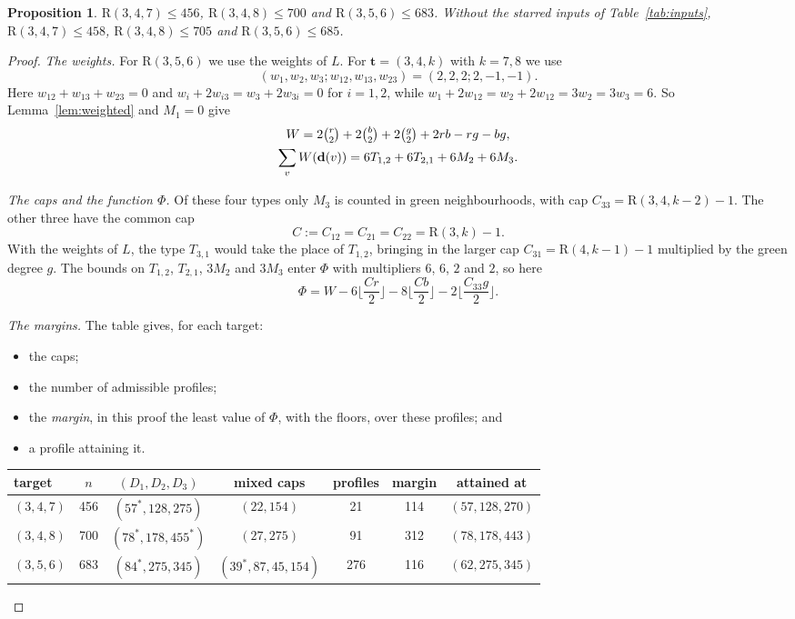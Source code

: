 \documentclass[11pt]{article}
\theoremstyle{spacedplain}
\newtheorem{proposition}[theorem]{Proposition}
\theoremstyle{spaceddef}
\theoremstyle{spacedremark}
\newcommand{\R}{\mathrm{R}}
\newcommand{\bt}{\mathbf{t}}
\begin{document}
\begin{proposition}\label{prop:supp}
$\R(3,4,7)\le 456$, $\R(3,4,8)\le 700$ and $\R(3,5,6)\le 683$.
Without the starred inputs of Table~\ref{tab:inputs}, $\R(3,4,7)\le 458$, $\R(3,4,8)\le 705$ and $\R(3,5,6)\le 685$.
\end{proposition}

\begin{proof}
\emph{The weights.}
For $\R(3,5,6)$ we use the weights of $L$.
For $\bt=(3,4,k)$ with $k=7,8$ we use
\[
(w_1,w_2,w_3;w_{12},w_{13},w_{23})=(2,2,2;2,-1,-1).
\]
Here $w_{12}+w_{13}+w_{23}=0$ and $w_i+2w_{i3}=w_3+2w_{3i}=0$ for $i=1,2$, while $w_1+2w_{12}=w_2+2w_{12}=3w_2=3w_3=6$.
So Lemma~\ref{lem:weighted} and $M_1=0$ give
\begin{gather*}
W=2\tbinom r2+2\tbinom b2+2\tbinom g2+2rb-rg-bg,\\
\sum_vW(\mathbf d(v))=6T_{1,2}+6T_{2,1}+6M_2+6M_3 .
\end{gather*}

\emph{The caps and the function $\Phi$.}
Of these four types only $M_3$ is counted in green neighbourhoods, with cap $C_{33}=\R(3,4,k-2)-1$.
The other three have the common cap
\[
C:=C_{12}=C_{21}=C_{22}=\R(3,k)-1.
\]
With the weights of $L$, the type $T_{3,1}$ would take the place of $T_{1,2}$, bringing in the larger cap $C_{31}=\R(4,k-1)-1$ multiplied by the green degree $g$.
The bounds on $T_{1,2}$, $T_{2,1}$, $3M_2$ and $3M_3$ enter $\Phi$ with multipliers $6$, $6$, $2$ and $2$, so here
\[
\Phi=W-6\Big\lfloor\frac{Cr}{2}\Big\rfloor-8\Big\lfloor\frac{Cb}{2}\Big\rfloor-2\Big\lfloor\frac{C_{33}g}{2}\Big\rfloor .
\]

\emph{The margins.}
The table gives, for each target:
\begin{itemize}
\item the caps;
\item the number of admissible profiles;
\item the \emph{margin}, in this proof the least value of $\Phi$, with the floors, over these profiles; and
\item a profile attaining it.
\end{itemize}
\begin{center}\small
\begin{tabular}{lcccccc}
\toprule
target & $n$ & $(D_1,D_2,D_3)$ & mixed caps & profiles & margin & attained at\\
\midrule
$(3,4,7)$ & 456 & $(57^*,128,275)$ & $(22,154)$ & 21 & 114 & $(57,128,270)$\\
$(3,4,8)$ & 700 & $(78^*,178,455^*)$ & $(27,275)$ & 91 & 312 & $(78,178,443)$\\
$(3,5,6)$ & 683 & $(84^*,275,345)$ & $(39^*,87,45,154)$ & 276 & 116 & $(62,275,345)$\\
\bottomrule
\end{tabular}
\end{center}


\end{proof}
\end{document}

